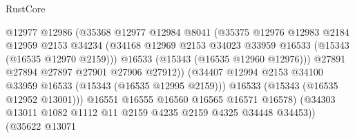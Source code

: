 \begin{lexlean}{RustCore}
\begin{coremodule}
                                      @12977
                                      @12986
                                      (@35368
                                        @12977
                                        @12984
                                        @8041
                                        (@35375
                                          @12976
                                          @12983
                                          @2184
                                          @12959
                                          @2153
                                          @34234
                                          (@34168
                                            @12969
                                            @2153
                                            @34023
                                            @33959
                                            @16533
                                            (@15343 (@16535 @12970 @2159)))
                                          @16533
                                          (@15343 (@16535 @12960 @12976)))
                                        @27891
                                        @27894
                                        @27897
                                        @27901
                                        @27906
                                        @27912))
                                    (@34407
                                      @12994
                                      @2153
                                      @34100
                                      @33959
                                      @16533
                                      (@15343 (@16535 @12995 @2159)))
                                    @16533
                                    (@15343 (@16535 @12952 @13001)))
                                  @16551
                                  @16555
                                  @16560
                                  @16565
                                  @16571
                                  @16578)
                                (@34303
                                  @13011
                                  @1082
                                  @1112
                                  @11
                                  @2159
                                  @4235
                                  @2159
                                  @4325
                                  @34448
                                  @34453))
                              (@35622
                                @13071

\end{coremodule}
\end{lexlean}
